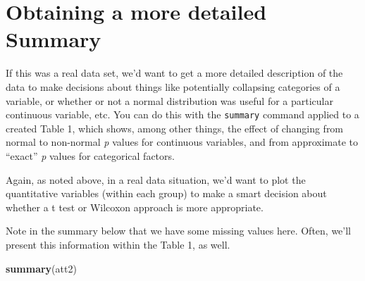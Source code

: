 \documentclass[]{book}
\newenvironment{Shaded}{\begin{snugshade}}{\end{snugshade}}
\newcommand{\KeywordTok}[1]{\textcolor[rgb]{0.13,0.29,0.53}{\textbf{#1}}}
\newcommand{\NormalTok}[1]{#1}
\theoremstyle{definition}
\theoremstyle{definition}
\theoremstyle{definition}
\theoremstyle{remark}
\begin{document}
\section{Obtaining a more detailed
Summary}\label{obtaining-a-more-detailed-summary}

If this was a real data set, we'd want to get a more detailed
description of the data to make decisions about things like potentially
collapsing categories of a variable, or whether or not a normal
distribution was useful for a particular continuous variable, etc. You
can do this with the \texttt{summary} command applied to a created Table
1, which shows, among other things, the effect of changing from normal
to non-normal \emph{p} values for continuous variables, and from
approximate to ``exact'' \emph{p} values for categorical factors.

Again, as noted above, in a real data situation, we'd want to plot the
quantitative variables (within each group) to make a smart decision
about whether a t test or Wilcoxon approach is more appropriate.

Note in the summary below that we have some missing values here. Often,
we'll present this information within the Table 1, as well.

\begin{Shaded}
\begin{Highlighting}[]
\KeywordTok{summary}\NormalTok{(att2)}
\end{Highlighting}
\end{Shaded}
\end{document}
